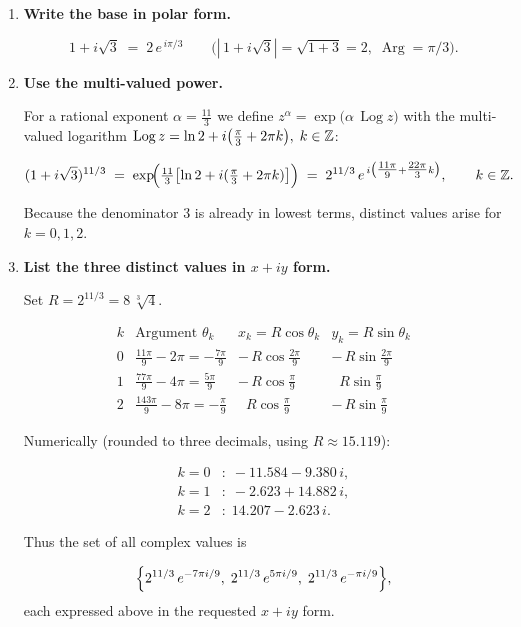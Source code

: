 \documentclass[12pt]{article}
\DeclareMathOperator{\Log}{Log}
\DeclareMathOperator{\Arg}{Arg}
\theoremstyle{definition} %
\theoremstyle{plain} %
\begin{document}
\begin{enumerate}
  \item \textbf{Write the base in polar form.}
  
  \[
  1+i\sqrt3 \;=\; 2\,e^{\,i\pi/3}
  \qquad
  \bigl(|\,1+i\sqrt3|=\sqrt{1+3}=2,\;
        \Arg= \pi/3\bigr).
  \]
  
  \item \textbf{Use the multi-valued power.}
  
  For a rational exponent \(\alpha=\tfrac{11}{3}\) we define  
  \(z^{\alpha}= \exp\!\bigl(\alpha\,\Log z\bigr)\) with the
  multi-valued logarithm
  \(\Log z=\ln2 + i\bigl(\frac{\pi}{3}+2\pi k\bigr),\;k\in\Bbb Z\):
  
  \[
  (1+i\sqrt3)^{11/3}
        \;=\;
        \exp\!\Bigl(
            \tfrac{11}{3}
            \bigl[\ln 2 + i(\tfrac{\pi}{3}+2\pi k)\bigr]
          \Bigr)
        \;=\;
        2^{11/3}\,
        e^{\,i\bigl(\tfrac{11\pi}{9}+\tfrac{22\pi}{3}k\bigr)},
        \qquad k\in\Bbb Z.
  \]
  
  Because the denominator \(3\) is already in lowest terms,
  distinct values arise for \(k=0,1,2\).
  
  \item \textbf{List the three distinct values in
                  \(x+iy\) form.}
  
  Set \(R=2^{11/3}=8\,\sqrt[3]{4}\).
  
  \[
  \begin{array}{c|c|c|c}
  k & \text{Argument } \theta_k
    & x_k = R\cos\theta_k & y_k = R\sin\theta_k \\ \hline
  0 & \displaystyle\frac{11\pi}{9}-2\pi
      =-\frac{7\pi}{9}
    & -\,R\cos\tfrac{2\pi}{9}
    & -\,R\sin\tfrac{2\pi}{9} \\[6pt]
  1 & \displaystyle\frac{77\pi}{9}-4\pi
      =\frac{5\pi}{9}
    & -\,R\cos\tfrac{\pi}{9}
    & \;\;R\sin\tfrac{\pi}{9} \\[6pt]
  2 & \displaystyle\frac{143\pi}{9}-8\pi
      =-\frac{\pi}{9}
    & \;\;R\cos\tfrac{\pi}{9}
    & -\,R\sin\tfrac{\pi}{9}
  \end{array}
  \]
  
  Numerically (rounded to three decimals, using \(R\approx 15.119\)):
  
  \[
  \boxed{
  \begin{aligned}
  k=0 &: \;-11.584 - 9.380\,i,\\[2pt]
  k=1 &: \;-2.623  + 14.882\,i,\\[2pt]
  k=2 &: \;14.207 - 2.623\,i.
  \end{aligned}}
  \]
  
  Thus the set of all complex values is  
  
  \[
  \Bigl\{
    2^{11/3}\,e^{-7\pi i/9},\;
    2^{11/3}\,e^{5\pi i/9},\;
    2^{11/3}\,e^{-\pi i/9}
  \Bigr\},
  \]
  each expressed above in the requested \(x+iy\) form.
  \end{enumerate}
\end{document}
